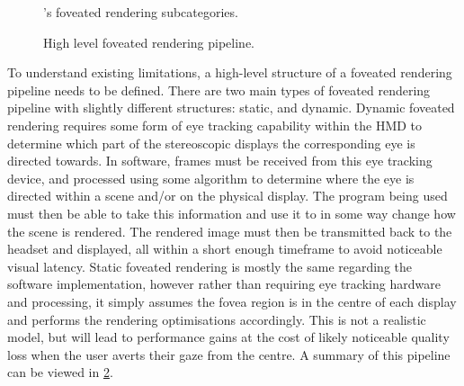 \documentclass[a4paper,11pt]{article}
\begin{document}
\begin{figure}
  \begin{center}
    
    \caption{\citeauthor{mohanto2022integrative}'s\cite{mohanto2022integrative} foveated rendering subcategories.}
    \label{fig:types}
  \end{center}
\end{figure}

\begin{figure}
  \begin{center}
    
    \caption{High level foveated rendering pipeline.}
    \label{fig:pipeline}
  \end{center}
\end{figure}

To understand existing limitations, a high-level structure of a foveated rendering pipeline needs to be defined. There are two main types of foveated rendering pipeline with slightly different structures: static, and dynamic\cite{mohanto2022integrative}. Dynamic foveated rendering requires some form of eye tracking capability within the HMD to determine which part of the stereoscopic displays the corresponding eye is directed towards. In software, frames must be received from this eye tracking device, and processed using some algorithm to determine where the eye is directed within a scene and/or on the physical display. The program being used must then be able to take this information and use it to in some way change how the scene is rendered. The rendered image must then be transmitted back to the headset and displayed, all within a short enough timeframe to avoid noticeable visual latency. Static foveated rendering is mostly the same regarding the software implementation, however rather than requiring eye tracking hardware and processing, it simply assumes the fovea region is in the centre of each display and performs the rendering optimisations accordingly. This is not a realistic model, but will lead to performance gains at the cost of likely noticeable quality loss when the user averts their gaze from the centre. A summary of this pipeline can be viewed in \cref{fig:pipeline}.
\end{document}
